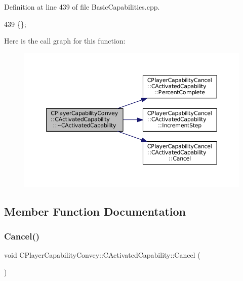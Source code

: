 Definition at line 439 of file Basic\+Capabilities.\+cpp.


\begin{DoxyCode}
439 \{\};
\end{DoxyCode}
Here is the call graph for this function\+:
\nopagebreak
\begin{figure}[H]
\begin{center}
\leavevmode
\includegraphics[width=350pt]{classCPlayerCapabilityConvey_1_1CActivatedCapability_a10c78ea328de946070399c5596915641_cgraph}
\end{center}
\end{figure}


\subsection{Member Function Documentation}
\hypertarget{classCPlayerCapabilityConvey_1_1CActivatedCapability_ad84a94a1ae3647ea160e262a0154e229}{}\label{classCPlayerCapabilityConvey_1_1CActivatedCapability_ad84a94a1ae3647ea160e262a0154e229} 
\subsubsection{\texorpdfstring{Cancel()}{Cancel()}}
{\footnotesize\ttfamily void C\+Player\+Capability\+Convey\+::\+C\+Activated\+Capability\+::\+Cancel (\begin{DoxyParamCaption}{ }\end{DoxyParamCaption})\hspace{0.3cm}{\ttfamily [virtual]}}



